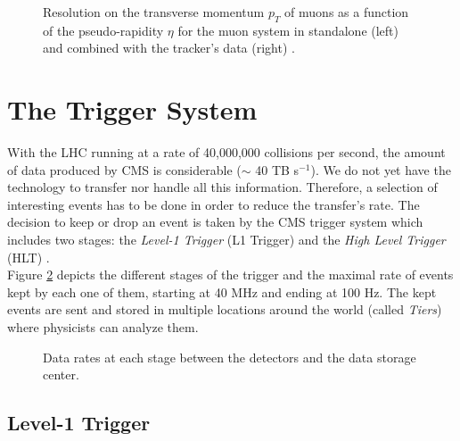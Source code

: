     			\begin{figure}[h!]
    				\centering
    				\caption{Resolution on the transverse momentum $ p_T $ of muons as a function of the pseudo-rapidity $ \eta $ for the muon system in standalone (left) and combined with the tracker's data (right) \Cite{CMS_Performances}.}
    				\label{fig:muon_chambers__performances}
    			\end{figure}

    \section{The Trigger System}




    		With the LHC running at a rate of 40,000,000 collisions per second, the amount of data produced by CMS is considerable ($ \sim $ 40 TB s$ ^{-1} $). We do not yet have the technology to transfer nor handle all this information. Therefore, a selection of interesting events has to be done in order to reduce the transfer's rate. The decision to keep or drop an event is taken by the CMS trigger system which includes two stages: the \emph{Level-1 Trigger} (L1 Trigger) and the \emph{High Level Trigger} (HLT) \Cite{CMS_at_LHC}. \\

    		Figure \ref{fig:trigger_system_and_reconstruction_algorithms__rates} depicts the different stages of the trigger and the maximal rate of events kept by each one of them, starting at 40 MHz and ending at 100 Hz. The kept events are sent and stored in multiple locations around the world (called \emph{Tiers}) where physicists can analyze them.

    		\begin{figure}[h!]
    			\centering
    			\caption{Data rates at each stage between the detectors and the data storage center. \Cite{CMS_Trigger_System}}
    			\label{fig:trigger_system_and_reconstruction_algorithms__rates}
    		\end{figure}

    		\subsection{Level-1 Trigger}
    		\label{sec:trigger_system_and_reconstruction_algorithms__level_1_trigger}

